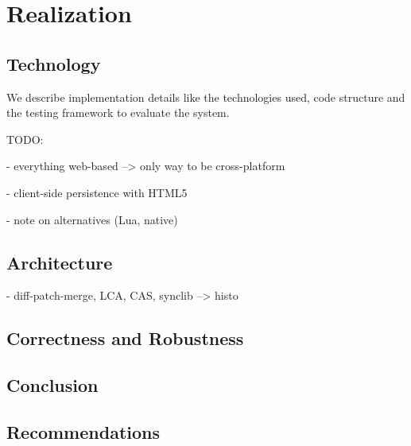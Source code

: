 
\chapter{Realization}
\label{sec:realization}


\section{Technology}
We describe implementation details like the technologies used, code structure and the testing framework to evaluate the system.

TODO:

- everything web-based --> only way to be cross-platform

- client-side persistence with HTML5

- note on alternatives (Lua, native)

\section{Architecture}

- diff-patch-merge, LCA, CAS, synclib --> histo

\section{Correctness and Robustness}

\section{Conclusion}

\section{Recommendations}
